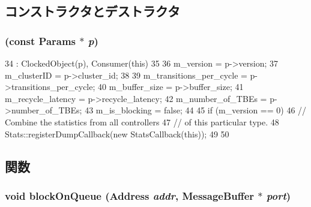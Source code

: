 \subsection{コンストラクタとデストラクタ}
\hypertarget{classAbstractController_a59d22e188a5f6fde018cb048098296d5}{
\subsubsection[{AbstractController}]{ (const {\bf Params} $\ast$ {\em p})}}
\label{classAbstractController_a59d22e188a5f6fde018cb048098296d5}



\begin{DoxyCode}
34     : ClockedObject(p), Consumer(this)
35 {
36     m_version = p->version;
37     m_clusterID = p->cluster_id;
38 
39     m_transitions_per_cycle = p->transitions_per_cycle;
40     m_buffer_size = p->buffer_size;
41     m_recycle_latency = p->recycle_latency;
42     m_number_of_TBEs = p->number_of_TBEs;
43     m_is_blocking = false;
44 
45     if (m_version == 0) {
46         // Combine the statistics from all controllers
47         // of this particular type.
48         Stats::registerDumpCallback(new StatsCallback(this));
49     }
50 }
\end{DoxyCode}


\subsection{関数}
\hypertarget{classAbstractController_af682f6c6bb8d16137c284112954156fb}{
\subsubsection[{blockOnQueue}]{\setlength{\rightskip}{0pt plus 5cm}void blockOnQueue ({\bf Address} {\em addr}, \/  {\bf MessageBuffer} $\ast$ {\em port})}}
\label{classAbstractController_af682f6c6bb8d16137c284112954156fb}



